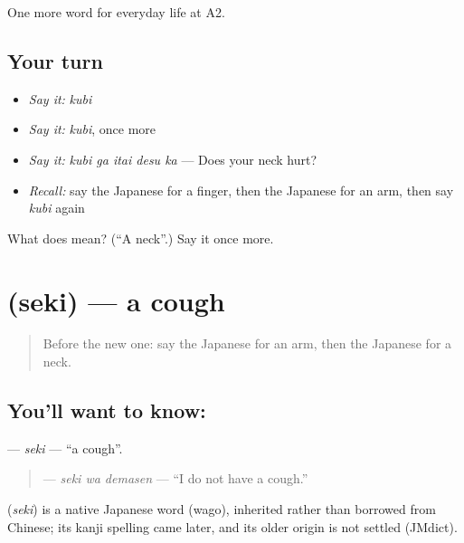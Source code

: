 \begin{grammarlens}[title={What you've built}]
One more word for everyday life at A2.
\end{grammarlens}

\subsection*{Your turn}
\begin{itemize}
\raggedright
  \item \emph{Say it:} \emph{kubi}
  \item \emph{Say it:} \emph{kubi}, once more
  \item \emph{Say it:} \emph{kubi ga itai desu ka} — Does your neck hurt?
  \item \emph{Recall:} say the Japanese for a finger, then the Japanese for an arm, then say \emph{kubi} again
\end{itemize}

\begin{tcolorbox}[breakable,colback=teal!4,colframe=teal!35!black,title={Before you move on}]
What does  mean? (\textquotedblleft{}A neck\textquotedblright{}.) Say it once more.
\end{tcolorbox}
\section[\texorpdfstring{\ja{せき} (seki)}{せき (seki)}]{ (seki) — a cough}

\label{lesson:JA-C215-seki}



\begin{quote}
Before the new one: say the Japanese for an arm, then the Japanese for a neck.
\end{quote}

\subsection*{You'll want to know: }
\textbf{} — \emph{seki} — \textquotedblleft{}a cough\textquotedblright{}.

\begin{quote}
\textbf{ } — \emph{seki wa demasen} — \textquotedblleft{}I do not have a cough.\textquotedblright{}
\end{quote}

\begin{cousinweb}
\textbf{} (\emph{seki}) is a native Japanese word (wago), inherited rather than borrowed from Chinese; its kanji spelling came later, and its older origin is not settled (JMdict).
\end{cousinweb}

